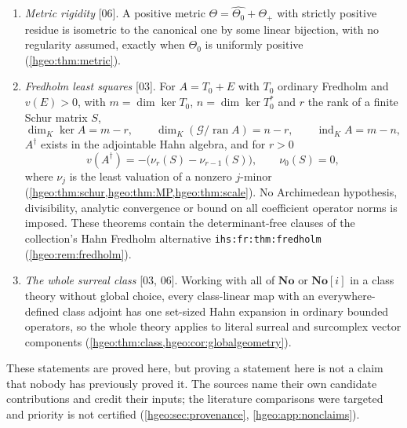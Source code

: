 \documentclass[11pt,letterpaper]{article}
\numberwithin{equation}{section}
\theoremstyle{definition}
\theoremstyle{remark}
\newcommand{\No}{\mathbf{No}}
\newcommand{\K}{K}
\newcommand{\ran}{\operatorname{ran}}
\newcommand{\ind}{\operatorname{ind}}
\newcommand{\cG}{\mathcal G}
\newcommand{\src}[1]{\textup{\textsf{\small[#1]}}}
\newcommand{\replabel}[1]{\nolinkurl{#1}}
\begin{document}
\begin{enumerate}[label=\textup{(\arabic*)},leftmargin=2.2em]
(\cref{hgeo:thm:lattice}); a positive operator with exponents $0,\eta,2\eta$
has a noncomplemented kernel (\cref{hgeo:thm:positivekernel}); a countable
family of mutually orthogonal rank-one projections has no least upper bound,
and countable simultaneous straightening fails for two distinct reasons
(\cref{hgeo:thm:nojoin,hgeo:cor:nosimultaneous,hgeo:prop:incoherent}).
\item \emph{Metric rigidity} \src{06}. A positive metric
$\Theta=\widehat{\Theta_0}+\Theta_+$ with strictly positive residue is
isometric to the canonical one by some linear bijection, with no regularity
assumed, exactly when $\Theta_0$ is uniformly positive
(\cref{hgeo:thm:metric}).
\item \emph{Fredholm least squares} \src{03}. For $A=T_0+E$ with $T_0$
ordinary Fredholm and $v(E)>0$, with $m=\dim\ker T_0$, $n=\dim\ker T_0^*$
and $r$ the rank of a finite Schur matrix $S$,
\[
 \dim_\K\ker A=m-r,\qquad
 \dim_\K(\cG/\ran A)=n-r,\qquad
 \ind_\K A=m-n,
\]
$A^\dagger$ exists in the adjointable Hahn algebra, and for $r>0$
\[
 v(A^\dagger)=-\bigl(\nu_r(S)-\nu_{r-1}(S)\bigr),
 \qquad \nu_0(S)=0,
\]
where $\nu_j$ is the least valuation of a nonzero $j$-minor
(\cref{hgeo:thm:schur,hgeo:thm:MP,hgeo:thm:scale}). No Archimedean
hypothesis, divisibility, analytic convergence or bound on all coefficient
operator norms is imposed. These theorems contain the determinant-free
clauses of the collection's Hahn Fredholm alternative
\replabel{ihs:fr:thm:fredholm} (\cref{hgeo:rem:fredholm}).
\item \emph{The whole surreal class} \src{03, 06}. Working with all of $\No$
or $\No[i]$ in a class theory without global choice, every class-linear map
with an everywhere-defined class adjoint has one set-sized Hahn expansion in
ordinary bounded operators, so the whole theory applies to literal surreal
and surcomplex vector components (\cref{hgeo:thm:class,hgeo:cor:globalgeometry}).
\end{enumerate}

These statements are proved here, but proving a statement here is not a
claim that nobody has previously proved it. The sources name their own
candidate contributions and credit their inputs; the literature comparisons
were targeted and priority is not certified (\cref{hgeo:sec:provenance},
\cref{hgeo:app:nonclaims}).
\end{document}
